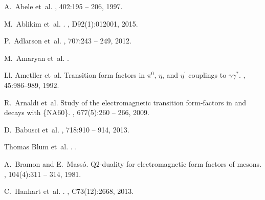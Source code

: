 \documentclass[epj]{webofc}
\begin{document}
% 
%
%
\begin{thebibliography}{00}
%
%

A.~Abele et~al.
, 402:195 -- 206, 1997.

M.~Ablikim et~al.
.
, D92(1):012001, 2015.

P.~Adlarson et~al.
, 707:243 -- 249, 2012.

M.~Amaryan et~al.
.

Ll. Ametller et~al.
\newblock Transition form factors in ${\ensuremath{\pi}}^{0}$,
  $\ensuremath{\eta}$, and ${\ensuremath{\eta}}^{\ensuremath{'}}$ couplings to
  $\ensuremath{\gamma}{\ensuremath{\gamma}}^{*}$.
, 45:986--989, 1992.

R.~Arnaldi et~al.
\newblock Study of the electromagnetic transition form-factors in and decays
  with \{NA60\}.
, 677(5):260 -- 266, 2009.

D.~Babusci et~al.
, 718:910 -- 914, 2013.

Thomas Blum et~al.
.
.

A.~Bramon and E.~Massó.
\newblock Q2-duality for electromagnetic form factors of mesons.
, 104(4):311 -- 314, 1981.

C.~Hanhart et~al.
.
, C73(12):2668, 2013.


\end{thebibliography}
\end{document}
